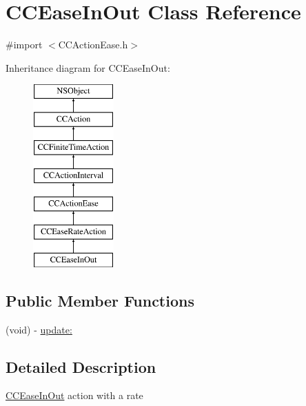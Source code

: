 \hypertarget{interface_c_c_ease_in_out}{\section{C\-C\-Ease\-In\-Out Class Reference}
\label{interface_c_c_ease_in_out}
}


{\ttfamily \#import $<$C\-C\-Action\-Ease.\-h$>$}

Inheritance diagram for C\-C\-Ease\-In\-Out\-:\begin{figure}[H]
\begin{center}
\leavevmode
\includegraphics[height=7.000000cm]{interface_c_c_ease_in_out}
\end{center}
\end{figure}
\subsection*{Public Member Functions}
\begin{DoxyCompactItemize}
\item 
(void) -\/ \hyperlink{interface_c_c_ease_in_out_ac514b0cef1f54314940bc00ae2a254a2}{update\-:}
\end{DoxyCompactItemize}


\subsection{Detailed Description}
\hyperlink{interface_c_c_ease_in_out}{C\-C\-Ease\-In\-Out} action with a rate 

